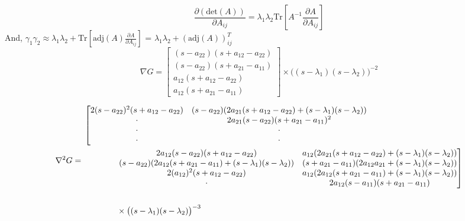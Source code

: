 \documentclass[a4paper, 11 pt]{article}
\begin{document}
\begin{equation}
  \frac{\partial(\text{det}(A))}{\partial A_{ij}} = \lambda_{1}\lambda_{2} \text{Tr}\left[A^{-1}\frac{\partial A}{\partial A_{ij}}\right]
\end{equation}
And, $\gamma_{1}\gamma_{2} \approx \lambda_{1}\lambda_{2} + \text{Tr}\left[\text{adj}(A)\frac{\partial A}{\partial A_{ij}}\right]$ = $\lambda_{1}\lambda_{2} + (\text{adj}(A))^{T}_{ij}$
\begin{equation}
  \nabla G = \left[ \begin{array}{c} (s - a_{22})(s + a_{12} - a_{22}) \\ (s - a_{22})(s + a_{21} - a_{11}) \\ a_{12}(s + a_{12} - a_{22}) \\ a_{12}(s + a_{21} - a_{11}) \end{array} \right] \times \big((s-\lambda_{1})(s-\lambda_{2})\big)^{-2}
\end{equation}

\begin{equation}
  \nabla^{2}G = \\
    \!\begin{aligned}
&
\left[\begin{matrix}
    2(s - a_{22})^{2}(s + a_{12} - a_{22}) & (s - a_{22})(2a_{21}(s+ a_{12} - a_{22}) + (s-\lambda_{1})(s-\lambda_{2})) \\
    \cdot & 2a_{21}(s - a_{22})(s+a_{21} - a_{11})^{2} \\
    \cdot & \cdot \\
    \cdot & \cdot \\
  \end{matrix}\right.\\
&\qquad\qquad
\left.\begin{matrix}

  {} 2a_{12}(s - a_{22})(s + a_{12} - a_{22}) & a_{12}(2a_{21}(s + a_{12} - a_{22}) + (s - \lambda_{1})(s - \lambda_{2})) \\
  {} (s-a_{22})(2a_{12}(s + a_{21} - a_{11}) + (s-\lambda_{1})(s-\lambda_{2}))  & (s + a_{21} - a_{11})(2a_{12}a_{21} + (s-\lambda_{1})(s-\lambda_{2})) \\
  {} 2(a_{12})^{2}(s + a_{12} - a_{22}) & a_{12}(2a_{12}(s + a_{21} - a_{11}) + (s-\lambda_{1})(s-\lambda_{2})) \\
  {} \cdot & 2a_{12}(s - a_{11})(s + a_{21} - a_{11}) 
\end{matrix}\right] \\ \\
&\qquad\qquad
  \times \big((s-\lambda_{1})(s-\lambda_{2})\big)^{-3}
\end{aligned}
\end{equation}
\end{document}
